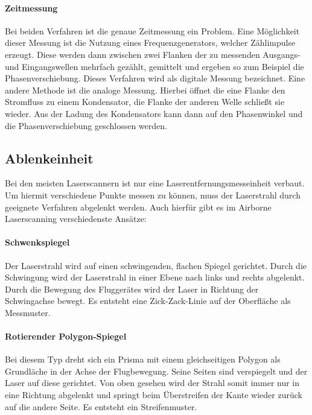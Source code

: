 \documentclass[a4paper,12pt,bibliography=totoc, listof=totoc,titlepage,pointlessnumbers]{scrreprt}
\begin{document}
\paragraph{Zeitmessung}
Bei beiden Verfahren ist die genaue Zeitmessung ein Problem. Eine Möglichkeit dieser Messung ist die Nutzung eines Frequenzgenerators, welcher Zähl\-imp\-ulse erzeugt. Diese werden dann zwischen zwei Flanken der zu messenden Ausgangs- und Eingangswellen mehrfach gezählt, gemittelt und ergeben so zum Beispiel die Phasenverschiebung. Dieses Verfahren wird als digitale Messung bezeichnet. Eine andere Methode ist die analoge Messung. Hierbei öffnet die eine Flanke den Stromfluss zu einem Kondensator, die Flanke der anderen Welle schließt sie wieder. Aus der Ladung des Kondensators kann dann auf den Phasenwinkel und die Phasenverschiebung geschlossen werden.  \citep[S. 314f]{Witte2006}

\subsection{Ablenkeinheit}
Bei den meisten Laser\-scan\-nern ist nur eine Laserentfernungsmesseinheit verbaut. Um hiermit verschiedene Punkte messen zu können, muss der Laserstrahl durch geeignete Verfahren abgelenkt werden. Auch hierfür gibt es im Air\-borne Laser\-scan\-ning verschiedenste Ansätze:

\paragraph{Schwenkspiegel}
Der Laserstrahl wird auf einen schwingenden, flachen Spiegel gerichtet. Durch die Schwingung wird der Laserstrahl in einer Ebene nach links und rechts abgelenkt. Durch die Bewegung des Fluggerätes wird der Laser in Richtung der Schwingachse bewegt. Es entsteht eine Zick-Zack-Linie auf der Oberfläche als Messmuster.

\paragraph{Rotierender Polygon-Spiegel}
Bei diesem Typ dreht sich ein Prisma mit einem gleichseitigen Polygon als Grundläche in der Achse der Flugbewegung. Seine  Seiten sind verspiegelt und der Laser auf diese gerichtet. Von oben gesehen wird der Strahl somit immer nur in eine Richtung abgelenkt und springt beim Überstreifen der Kante  wieder zurück auf die andere Seite. Es entsteht ein Streifenmuster.
\end{document}
